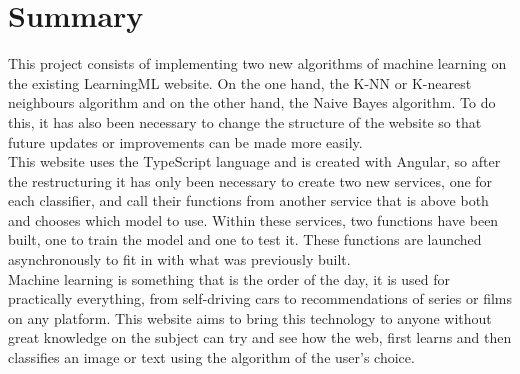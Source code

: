 \documentclass[a4paper, 12pt]{book}
\begin{document}

\chapter*{Summary}

This project consists of implementing two new algorithms of machine learning on the existing LearningML website. On the one hand, the K-NN or K-nearest neighbours algorithm and on the other hand, the Naive Bayes algorithm. To do this, it has also been necessary to change the structure of the website so that future updates or improvements can be made more easily.\\
This website uses the TypeScript language and is created with Angular, so after the restructuring it has only been necessary to create two new services, one for each classifier, and call their functions from another service that is above both and chooses which model to use. Within these services, two functions have been built, one to train the model and one to test it. These functions are launched asynchronously to fit in with what was previously built.\\
Machine learning is something that is the order of the day, it is used for practically everything, from self-driving cars to recommendations of series or films on any platform. This website aims to bring this technology to anyone without great knowledge on the subject can try and see how the web, first learns and then classifies an image or text using the algorithm of the user's choice.





\tableofcontents 
\cleardoublepage
\listoffigures %
\end{document}
